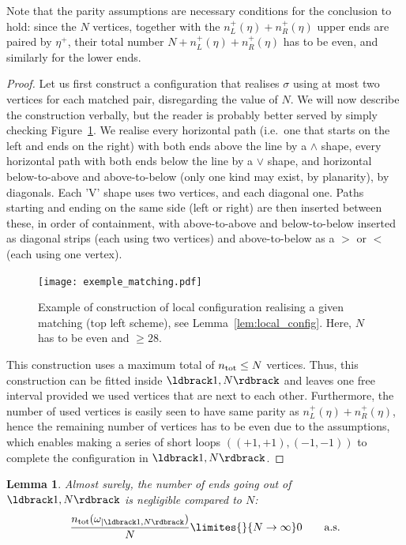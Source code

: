\documentclass[12pt]{amsart}
\newtheorem{lemma}{Lemma}
\theoremstyle{remark}
\newcommand{\Li}{\ldbrack} %
\newcommand{\Ri}{\rdbrack}
\begin{document}
Note that the parity assumptions are necessary conditions for the conclusion to hold: since the $N$ vertices, together with the $n^+_L(\eta)+n^+_R(\eta)$ upper ends are paired by $\eta^+$, their total number $N+n^+_L(\eta)+n^+_R(\eta)$ has to be even, and similarly for the lower ends. 

\begin{proof}
Let us first construct  a configuration that realises $\sigma$ using at most two vertices for each matched pair, disregarding the value of $N$. We will now describe the construction verbally, but the reader is probably better served by simply checking Figure~\ref{fig:exemple_matching}. We realise every horizontal path (i.e.\ one that starts on the left and ends on the right) with both ends above the line by a $\land$ shape, every horizontal path with both ends below the line by a $\lor$ shape, and horizontal below-to-above and above-to-below (only one kind may exist, by planarity), by diagonals. Each 'V' shape uses two vertices, and each diagonal one. Paths starting and ending on the same side (left or right) are then inserted between these, in order of containment, with above-to-above and below-to-below inserted as diagonal strips (each using two vertices) and above-to-below as a $>$ or $<$ (each using one vertex).

\begin{figure}
\texttt{[image: exemple\_matching.pdf]}
\caption{Example of construction of local configuration realising a given matching (top left scheme), see Lemma~\ref{lem:local_config}. Here, $N$ has to be even and $\ge28$.}
\label{fig:exemple_matching}
\end{figure}

This construction uses a maximum total of $n_{\rm tot}\le N$ vertices. Thus, this construction can be fitted inside $\Li1,N\Ri$ and leaves one free interval provided we used vertices that are next to each other. Furthermore, the number of used vertices is easily seen to have same parity as $n^+_L(\eta)+n^+_R(\eta)$, hence the remaining number of vertices has to be even due to the assumptions, which enables making a series of short loops $((+1,+1),(-1,-1))$ to complete the configuration in $\Li1,N\Ri$. 
\end{proof}

\begin{lemma}\label{lem:size_boundary}
Almost surely, the number of ends going out of $\Li1,N\Ri$ is negligible compared to $N$:
\begin{equation}\label{eqn:size_boundary}
\frac{\ntot(\omega_{|\Li1,N\Ri})}N\limites{}{N\to\infty}0\qquad \text{a.s.}
\end{equation}
\end{lemma}
\end{document}
